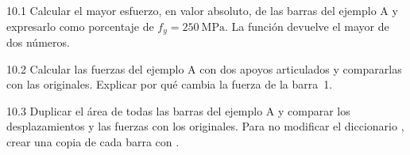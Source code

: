 \ejercicios

\begin{ejercicio}{10.1}
Calcular el mayor esfuerzo, en valor absoluto, de las barras del ejemplo A
y expresarlo como porcentaje de $f_y = \SI{250}{\mega\pascal}$. La función
 devuelve el mayor de dos números.
\end{ejercicio}

\begin{ejercicio}{10.2}
Calcular las fuerzas del ejemplo A con dos apoyos articulados y compararlas
con las originales. Explicar por qué cambia la fuerza de la barra~1.
\end{ejercicio}

\begin{ejercicio}{10.3}
Duplicar el área de todas las barras del ejemplo A y comparar los
desplazamientos y las fuerzas con los originales. Para no modificar el
diccionario , crear una copia de cada barra con .
\end{ejercicio}

